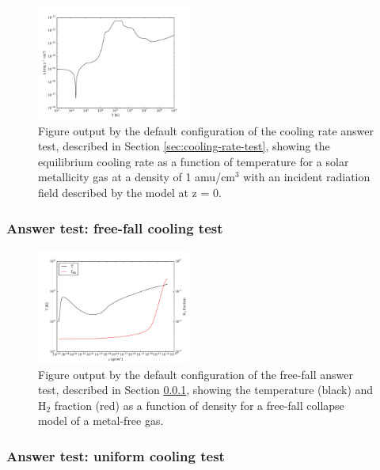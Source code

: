 \begin{figure}
  \centering
  \includegraphics[width=0.45\textwidth]{cooling_rate.pdf}
  \caption{
    Figure output by the default configuration of the cooling rate
    answer test, described in Section \ref{sec:cooling-rate-test},
    showing the equilibrium cooling rate as a function of temperature
    for a solar metallicity gas at a density of 1 amu/cm$^{3}$ with an
    incident radiation field described by the
    \citet{2012ApJ...746..125H} model at z = 0.
  } \label{fig:cooling-rate-test}
\end{figure}

\subsubsection{Answer test: free-fall cooling test}
\label{sec:free-fall-test}

\begin{figure}
  \centering
  \includegraphics[width=0.45\textwidth]{freefall.pdf}
  \caption{
    Figure output by the default configuration of the free-fall answer
    test, described in Section \ref{sec:free-fall-test}, showing the
    temperature (black) and H$_{2}$ fraction (red) as a function of
    density for a free-fall collapse model of a metal-free gas.
  } \label{fig:free-fall-test}
\end{figure}

\subsubsection{Answer test: uniform cooling test}
\label{sec:uniform-cooling-test}

